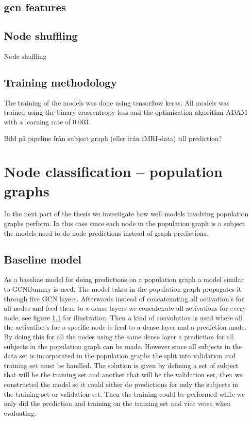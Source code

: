 \subsection{gcn features}

\subsection{Node shuffling}
Node shuffling

\subsection{Training methodology}
The training of the models was done using tensorflow keras. All models was trained using the binary crossentropy loss and the optimization algorithm ADAM with a learning rate of 0.003. 

Bild på pipeline från subject graph (eller från fMRI-data) till prediction?

\section{Node classification -- population graphs}
In the next part of the thesis we investigate how well models involving population graphs perform. In this case since each node in the population graph is a subject the models need to do node predictions instead of graph predictions. 
\subsection{Baseline model}
As a baseline model for doing predictions on a population graph a model similar to GCNDummy is used. The model takes in the population graph propagates it through five GCN layers. Afterwards instead of concatenating all activation's for all nodes and feed them to a dense layers we concatenate all activations for every node, see figure \ref{} for illustration. Then a kind of convolution is used where all the activation's for a specific node is feed to a dense layer and a prediction made. By doing this for all the nodes using the same dense layer a prediction for all subjects in the population graph can be made. However since all subjects in the data set is incorporated in the population graphs the split into validation and training set must be handled. The solution is given by defining a set of subject that will be the training set and another that will be the validation set, then we constructed the model so it could either do predictions for only the subjects in the training set or validation set. Then the training could be performed while we only did the prediction and training on the training set and vice versa when evaluating.

